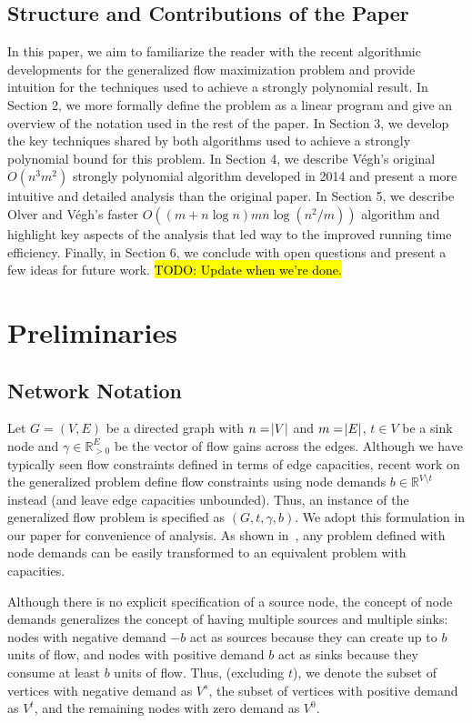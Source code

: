 \documentclass[11pt]{article}
\theoremstyle{definition}
\theoremstyle{definition}
\newcommand{\R}{\mathbb{R}}
\newcommand{\vsrc}{V^{s}}
\newcommand{\vsink}{V^{t}}
\newcommand{\vz}{V^{0}}
\newcommand{\todo}[1]{\hl{TODO: #1}}
\begin{document}
	\subsection{Structure and Contributions of the Paper} In this paper, we aim to familiarize the reader with the recent algorithmic developments for the generalized flow maximization problem and provide intuition for the techniques used to achieve a strongly polynomial result. In Section 2, we more formally define the problem as a linear program and give an overview of the notation used in the rest of the paper. In Section 3, we develop the key techniques shared by both algorithms used to achieve a strongly polynomial bound for this problem. In Section 4, we describe Végh's original $O(n^3m^2)$ strongly polynomial algorithm developed in 2014 and present a more intuitive and detailed analysis than the original paper. In Section 5, we describe Olver and Végh's faster $O((m + n\log n)mn\log(n^2 / m))$ algorithm and highlight key aspects of the analysis that led way to the improved running time efficiency. Finally, in Section 6, we conclude with open questions and present a few ideas for future work. \todo{Update when we're done.}
    
\section{Preliminaries}

	\subsection{Network Notation}

	Let $G=(V,E)$ be a directed graph with $n=\abs{V}$ and $m=\abs{E}$,
	$t \in V$ be a sink node and $\gamma \in \R_{>0}^E$ be the vector of flow gains
	across the edges. Although we have typically seen flow constraints defined in terms of
	edge capacities, recent work on the generalized problem define flow
	constraints using node demands $b \in \R^{V \setminus t}$ instead (and leave
	edge capacities unbounded). Thus, an instance of the generalized flow problem
	is specified as $(G, t, \gamma, b)$.
	We adopt this formulation in our paper for
	convenience of analysis. As shown in~\cite{Vegh2013}, any problem defined with
	node demands can be easily transformed to an equivalent problem with
	capacities. 

	Although there is no explicit specification of a source node, the concept of
	node demands generalizes the concept of having multiple sources and multiple
	sinks: nodes with negative demand $-b$ act as sources because they can create
	up to $b$ units of flow, and nodes with positive demand $b$ act as sinks 
	because they consume at least $b$ units of flow. Thus, (excluding $t$), we denote the subset of
	vertices with negative demand as $\vsrc$, the subset of vertices with positive
	demand as $\vsink$, and the remaining nodes with zero demand as $\vz$.
\end{document}
